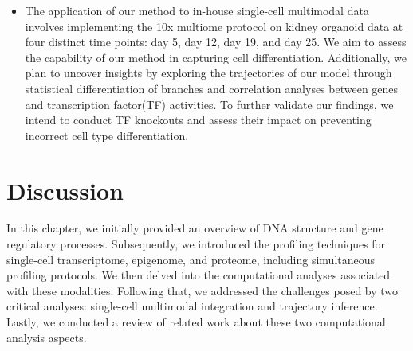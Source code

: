 \begin{itemize}
	\item The application of our method to in-house single-cell multimodal data involves implementing the 10x multiome protocol on kidney organoid data at four distinct time points: day 5, day 12, day 19, and day 25. We aim to assess the capability of our method in capturing cell differentiation. Additionally, we plan to uncover insights by exploring the trajectories of our model through statistical differentiation of branches and correlation analyses between genes and transcription factor(TF) activities. To further validate our findings, we intend to conduct TF knockouts and assess their impact on preventing incorrect cell type differentiation.

\end{itemize}


\section{Discussion}
\label{background:Discussion}
In this chapter, we initially provided an overview of DNA structure and gene regulatory processes. Subsequently, we introduced the profiling techniques for single-cell transcriptome, epigenome, and proteome, including simultaneous profiling protocols. We then delved into the computational analyses associated with these modalities. Following that, we addressed the challenges posed by two critical analyses: single-cell multimodal integration and trajectory inference. Lastly, we conducted a review of related work about these two computational analysis aspects.


